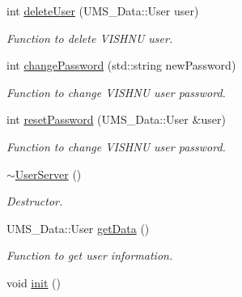 \begin{DoxyCompactItemize}
int \hyperlink{classUserServer_acb26d67e359123b9b4b80fa007d37423}{deleteUser} (UMS\_\-Data::User user)
\begin{DoxyCompactList}\small\item\em Function to delete VISHNU user. \item\end{DoxyCompactList}\item 
int \hyperlink{classUserServer_a63b49fc59574e8b81fde104f09a4585e}{changePassword} (std::string newPassword)
\begin{DoxyCompactList}\small\item\em Function to change VISHNU user password. \item\end{DoxyCompactList}\item 
int \hyperlink{classUserServer_a3fc3db7042acf71dcb73c4c7924a9d1c}{resetPassword} (UMS\_\-Data::User \&user)
\begin{DoxyCompactList}\small\item\em Function to change VISHNU user password. \item\end{DoxyCompactList}\item 
\hypertarget{classUserServer_a12cc28c2c2c5b3c88d2f760c97bd088d}{
\hyperlink{classUserServer_a12cc28c2c2c5b3c88d2f760c97bd088d}{$\sim$UserServer} ()}
\label{classUserServer_a12cc28c2c2c5b3c88d2f760c97bd088d}

\begin{DoxyCompactList}\small\item\em Destructor. \item\end{DoxyCompactList}\item 
UMS\_\-Data::User \hyperlink{classUserServer_a539501563b61edfcb374ad6954b3d930}{getData} ()
\begin{DoxyCompactList}\small\item\em Function to get user information. \item\end{DoxyCompactList}\item 
\hypertarget{classUserServer_a0aad281d77ffbe98423f3275884781c1}{
void \hyperlink{classUserServer_a0aad281d77ffbe98423f3275884781c1}{init} ()}
\label{classUserServer_a0aad281d77ffbe98423f3275884781c1}


\end{DoxyCompactItemize}
